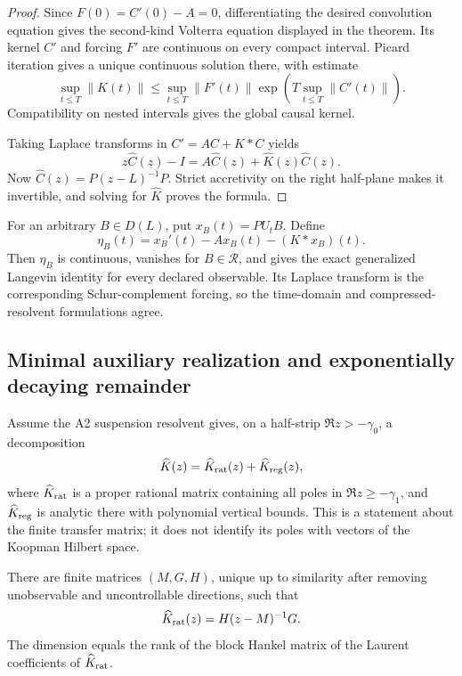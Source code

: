 \begin{proof}
Since \(F(0)=C'(0)-A=0\), differentiating the desired convolution equation
gives the second-kind Volterra equation displayed in the theorem.  Its kernel
\(C'\) and forcing \(F'\) are continuous on every compact interval.  Picard
iteration gives a unique continuous solution there, with estimate
\[
 \sup_{t\le T}\|K(t)\|
 \le \sup_{t\le T}\|F'(t)\|
 \exp\left(T\sup_{t\le T}\|C'(t)\|\right).
\]
Compatibility on nested intervals gives the global causal kernel.

Taking Laplace transforms in
\(C'=AC+K*C\) yields
\[
 z\widehat C(z)-I=A\widehat C(z)+
 \widehat K(z)\widehat C(z).
\]
Now \(\widehat C(z)=P(z-L)^{-1}P\).  Strict accretivity on the right
half-plane makes it invertible, and solving for \(\widehat K\) proves the
formula.
\end{proof}

For an arbitrary \(B\in D(L)\), put \(x_B(t)=PU_tB\).  Define
\[
 \eta_B(t)=x_B'(t)-Ax_B(t)-(K*x_B)(t).
\]
Then \(\eta_B\) is continuous, vanishes for \(B\in\mathcal R\), and gives the
exact generalized Langevin identity for every declared observable.  Its
Laplace transform is the corresponding Schur-complement forcing, so the
time-domain and compressed-resolvent formulations agree.

\subsection{Minimal auxiliary realization and exponentially decaying remainder}

Assume the A2 suspension resolvent gives, on a half-strip
\(\Re z>-\gamma_0\), a decomposition
\[
 \widehat K(z)=\widehat K_{\rm rat}(z)+
 \widehat K_{\rm reg}(z),
\]
where \(\widehat K_{\rm rat}\) is a proper rational matrix containing all
poles in \(\Re z\ge-\gamma_1\), and
\(\widehat K_{\rm reg}\) is analytic there with polynomial vertical bounds.
This is a statement about the finite transfer matrix; it does not identify its
poles with vectors of the Koopman Hilbert space.

\begin{lemma}
\label{lem:r4-a4-realization}
There are finite matrices \((M,G,H)\), unique up to similarity after removing
unobservable and uncontrollable directions, such that
\[
 \widehat K_{\rm rat}(z)=H(z-M)^{-1}G.
\]
The dimension equals the rank of the block Hankel matrix of the Laurent
coefficients of \(\widehat K_{\rm rat}\).
\end{lemma}

